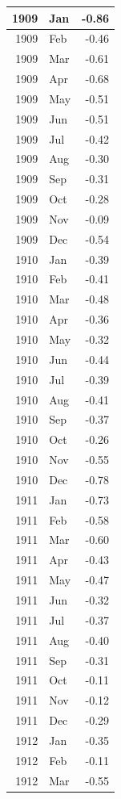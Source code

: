 \documentclass[
]{article}
\begin{document}
\begin{table}[H]
\begin{tabular}[t]{r|l|r}
\hline
1909 & Jan & -0.86\\
\hline
1909 & Feb & -0.46\\
\hline
1909 & Mar & -0.61\\
\hline
1909 & Apr & -0.68\\
\hline
1909 & May & -0.51\\
\hline
1909 & Jun & -0.51\\
\hline
1909 & Jul & -0.42\\
\hline
1909 & Aug & -0.30\\
\hline
1909 & Sep & -0.31\\
\hline
1909 & Oct & -0.28\\
\hline
1909 & Nov & -0.09\\
\hline
1909 & Dec & -0.54\\
\hline
1910 & Jan & -0.39\\
\hline
1910 & Feb & -0.41\\
\hline
1910 & Mar & -0.48\\
\hline
1910 & Apr & -0.36\\
\hline
1910 & May & -0.32\\
\hline
1910 & Jun & -0.44\\
\hline
1910 & Jul & -0.39\\
\hline
1910 & Aug & -0.41\\
\hline
1910 & Sep & -0.37\\
\hline
1910 & Oct & -0.26\\
\hline
1910 & Nov & -0.55\\
\hline
1910 & Dec & -0.78\\
\hline
1911 & Jan & -0.73\\
\hline
1911 & Feb & -0.58\\
\hline
1911 & Mar & -0.60\\
\hline
1911 & Apr & -0.43\\
\hline
1911 & May & -0.47\\
\hline
1911 & Jun & -0.32\\
\hline
1911 & Jul & -0.37\\
\hline
1911 & Aug & -0.40\\
\hline
1911 & Sep & -0.31\\
\hline
1911 & Oct & -0.11\\
\hline
1911 & Nov & -0.12\\
\hline
1911 & Dec & -0.29\\
\hline
1912 & Jan & -0.35\\
\hline
1912 & Feb & -0.11\\
\hline
1912 & Mar & -0.55\\

\end{tabular}
\end{table}
\end{document}
